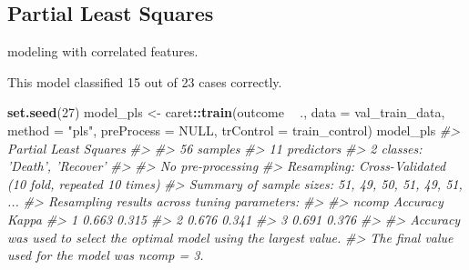 \documentclass[]{book}
\newenvironment{Shaded}{\begin{snugshade}}{\end{snugshade}}
\newcommand{\CommentTok}[1]{\textcolor[rgb]{0.56,0.35,0.01}{\textit{#1}}}
\newcommand{\DataTypeTok}[1]{\textcolor[rgb]{0.13,0.29,0.53}{#1}}
\newcommand{\DecValTok}[1]{\textcolor[rgb]{0.00,0.00,0.81}{#1}}
\newcommand{\KeywordTok}[1]{\textcolor[rgb]{0.13,0.29,0.53}{\textbf{#1}}}
\newcommand{\NormalTok}[1]{#1}
\newcommand{\OperatorTok}[1]{\textcolor[rgb]{0.81,0.36,0.00}{\textbf{#1}}}
\newcommand{\OtherTok}[1]{\textcolor[rgb]{0.56,0.35,0.01}{#1}}
\newcommand{\StringTok}[1]{\textcolor[rgb]{0.31,0.60,0.02}{#1}}
\begin{document}
\hypertarget{partial-least-squares}{%
\subsection{Partial Least Squares}\label{partial-least-squares}}

modeling with correlated features.

This model classified 15 out of 23 cases correctly.

\begin{Shaded}
\begin{Highlighting}[]
\KeywordTok{set.seed}\NormalTok{(}\DecValTok{27}\NormalTok{)}
\NormalTok{model_pls <-}\StringTok{ }\NormalTok{caret}\OperatorTok{::}\KeywordTok{train}\NormalTok{(outcome }\OperatorTok{~}\StringTok{ }\NormalTok{.,}
                             \DataTypeTok{data =}\NormalTok{ val_train_data,}
                             \DataTypeTok{method =} \StringTok{"pls"}\NormalTok{,}
                             \DataTypeTok{preProcess =} \OtherTok{NULL}\NormalTok{,}
                             \DataTypeTok{trControl =}\NormalTok{ train_control)}
\NormalTok{model_pls}
\CommentTok{#> Partial Least Squares }
\CommentTok{#> }
\CommentTok{#> 56 samples}
\CommentTok{#> 11 predictors}
\CommentTok{#>  2 classes: 'Death', 'Recover' }
\CommentTok{#> }
\CommentTok{#> No pre-processing}
\CommentTok{#> Resampling: Cross-Validated (10 fold, repeated 10 times) }
\CommentTok{#> Summary of sample sizes: 51, 49, 50, 51, 49, 51, ... }
\CommentTok{#> Resampling results across tuning parameters:}
\CommentTok{#> }
\CommentTok{#>   ncomp  Accuracy  Kappa}
\CommentTok{#>   1      0.663     0.315}
\CommentTok{#>   2      0.676     0.341}
\CommentTok{#>   3      0.691     0.376}
\CommentTok{#> }
\CommentTok{#> Accuracy was used to select the optimal model using the largest value.}
\CommentTok{#> The final value used for the model was ncomp = 3.}
\end{Highlighting}
\end{Shaded}
\end{document}

